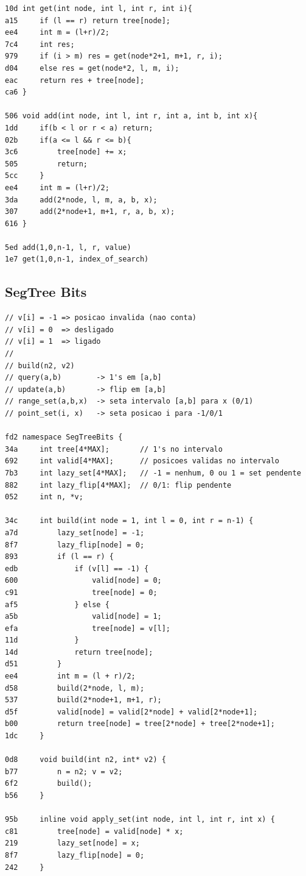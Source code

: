 \documentclass[11pt, a4paper, twoside]{article}
\begin{document}
{\begin{lstlisting}
10d int get(int node, int l, int r, int i){
a15     if (l == r) return tree[node];
ee4     int m = (l+r)/2;
7c4     int res;
979     if (i > m) res = get(node*2+1, m+1, r, i);
d04     else res = get(node*2, l, m, i); 
eac     return res + tree[node];
ca6 }

506 void add(int node, int l, int r, int a, int b, int x){
1dd     if(b < l or r < a) return;
02b     if(a <= l && r <= b){
3c6         tree[node] += x;
505         return;
5cc     }
ee4     int m = (l+r)/2;
3da     add(2*node, l, m, a, b, x);
307     add(2*node+1, m+1, r, a, b, x);
616 }

5ed add(1,0,n-1, l, r, value)
1e7 get(1,0,n-1, index_of_search)
\end{lstlisting}

\subsection{SegTree Bits}
\begin{lstlisting}
// v[i] = -1 => posicao invalida (nao conta)
// v[i] = 0  => desligado
// v[i] = 1  => ligado
//
// build(n2, v2)
// query(a,b)        -> 1's em [a,b]
// update(a,b)       -> flip em [a,b]
// range_set(a,b,x)  -> seta intervalo [a,b] para x (0/1)
// point_set(i, x)   -> seta posicao i para -1/0/1

fd2 namespace SegTreeBits {
34a     int tree[4*MAX];       // 1's no intervalo
692     int valid[4*MAX];      // posicoes validas no intervalo
7b3     int lazy_set[4*MAX];   // -1 = nenhum, 0 ou 1 = set pendente
882     int lazy_flip[4*MAX];  // 0/1: flip pendente
052     int n, *v;
    
34c     int build(int node = 1, int l = 0, int r = n-1) {
a7d         lazy_set[node] = -1;
8f7         lazy_flip[node] = 0;
893         if (l == r) {
edb             if (v[l] == -1) {
600                 valid[node] = 0;
c91                 tree[node] = 0;
af5             } else {
a5b                 valid[node] = 1;
efa                 tree[node] = v[l];
11d             }
14d             return tree[node];
d51         }
ee4         int m = (l + r)/2;
d58         build(2*node, l, m);
537         build(2*node+1, m+1, r);
d5f         valid[node] = valid[2*node] + valid[2*node+1];
b00         return tree[node] = tree[2*node] + tree[2*node+1];
1dc     }
    
0d8     void build(int n2, int* v2) {
b77         n = n2; v = v2;
6f2         build();
b56     }
    
95b     inline void apply_set(int node, int l, int r, int x) {
c81         tree[node] = valid[node] * x;
219         lazy_set[node] = x;
8f7         lazy_flip[node] = 0;
242     }
    

\end{lstlisting}}
\end{document}
